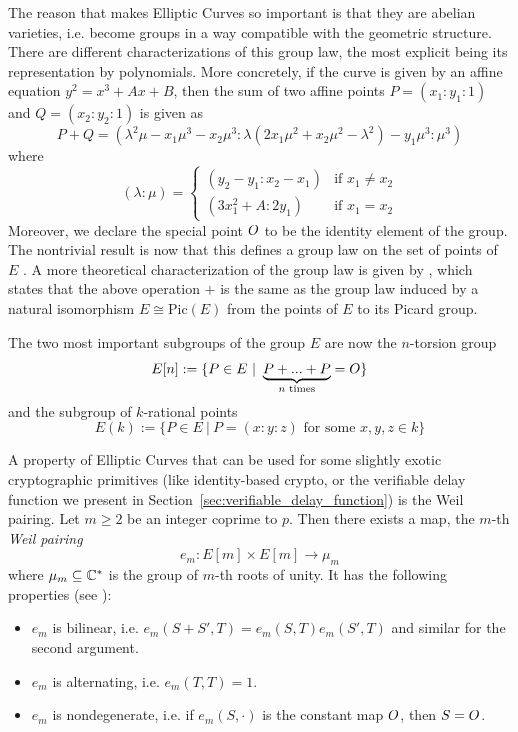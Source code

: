 The reason that makes Elliptic Curves so important is that they are abelian varieties, i.e. become groups in a way compatible with the geometric structure.
There are different characterizations of this group law, the most explicit being its representation by polynomials.
More concretely, if the curve is given by an affine equation $y^2 = x^3 + Ax + B$, then the sum of two affine points $P = (x_1 : y_1 : 1)$ and $Q = (x_2 : y_2 : 1)$ is given as
\begin{equation*}
    P + Q = ( \lambda^2\mu - x_1\mu^3 - x_2\mu^3 : \lambda(2x_1\mu^2 + x_2\mu^2 - \lambda^2) - y_1\mu^3 : \mu^3 )
\end{equation*}
where
\begin{equation*}
    (\lambda : \mu) = \begin{cases}
        (y_2 - y_1 : x_2 - x_1) & \text{if $x_1 \neq x_2$} \\
        (3x_1^2 + A : 2y_1) & \text{if $x_1 = x_2$}
    \end{cases}
\end{equation*}
Moreover, we declare the special point $O$ to be the identity element of the group.
The nontrivial result is now that this defines a group law on the set of points of $E$ \cite[Prop.~III.2.2]{arithmetic_elliptic_curves}. 
A more theoretical characterization of the group law is given by \cite[Prop.~III.3.4]{arithmetic_elliptic_curves}, which states that the above operation $+$ is the same as the group law induced by a natural isomorphism $E \cong \mathrm{Pic}(E)$ from the points of $E$ to its Picard group. 

The two most important subgroups of the group $E$ are now the $n$-torsion group
\begin{equation*}
    E[n] := \{ P \in E \ | \ \underbrace{P + ... + P}_{\text{$n$ times}} = \IdPoint \}
\end{equation*}
and the subgroup of $k$-rational points
\begin{equation*}
    E(k) := \{ P \in E \ | \ \text{$P = (x : y : z)$ for some $x, y, z \in k$} \}
\end{equation*}

A property of Elliptic Curves that can be used for some slightly exotic cryptographic primitives (like identity-based crypto, or the verifiable delay function we present in Section~\ref{sec:verifiable_delay_function}) is the Weil pairing.
Let $m \geq 2$ be an integer coprime to $p$.
Then there exists a map, the $m$-th \emph{Weil pairing}
\begin{equation*}
    e_m: E[m] \times E[m] \to \mu_m
\end{equation*}
where $\mu_m \subseteq \mathbb{C}^*$ is the group of $m$-th roots of unity.
It has the following properties (see \cite[Prop.~III.8.1]{arithmetic_elliptic_curves}):
\begin{itemize}
    \item $e_m$ is bilinear, i.e. $e_m(S + S', T) = e_m(S, T)e_m(S', T)$ and similar for the second argument.
    \item $e_m$ is alternating, i.e. $e_m(T, T) = 1$.
    \item $e_m$ is nondegenerate, i.e. if $e_m(S, \cdot)$ is the constant map $O$, then $S = O$.
\end{itemize}

